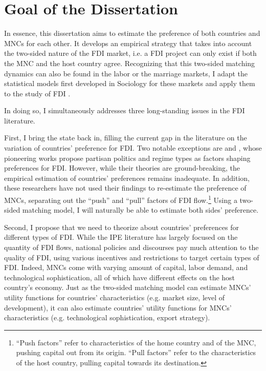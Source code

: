 \section{Goal of the Dissertation}

In essence, this dissertation aims to estimate the preference of both countries
and MNCs for each other. It develops an empirical strategy that takes into
account the two-sided nature of the FDI market, i.e. a FDI project can only
exist if both the MNC and the host country agree. Recognizing that this
two-sided matching dynamics can also be found in the labor or the marriage
markets, I adapt the statistical models first developed in Sociology for these
markets and apply them to the study of FDI \citep{Logan1996, Logan2008}.

In doing so, I simultaneously addresses three long-standing issues in the FDI literature.

First, I bring the state back in, filling the current gap in the literature on
the variation of countries' preference for FDI. Two notable exceptions are
\citet{Pinto2013} and \citet{Pandya2016}, whose pioneering works propose partisan politics
and regime types as factors shaping preferences for FDI. However,
while their theories are ground-breaking, the empirical estimation of countries'
preferences remains inadequate. In addition, these researchers have not
used their findings to re-estimate the preference of MNCs, separating out the
``push'' and ``pull'' factors of FDI flow.\footnote{``Push factors'' refer to
  characteristics of the home country and of the MNC, pushing capital out from its
  origin. ``Pull factors''
  refer to the characteristics of the host country, pulling capital towards its
  destination.} Using a two-sided matching model, I will naturally be able to
estimate both sides' preference.

Second, I propose that we need to theorize about countries' preferences for
different types of FDI. While the IPE literature has largely focused on the
quantity of FDI flows, national policies and discourses pay much attention to the quality of FDI, using various
incentives and restrictions to target certain types of FDI. Indeed, MNCs come
with varying amount of capital, labor demand, and technological sophistication,
all of which have different effects on the host country's economy. Just as the
two-sided matching model can estimate MNCs' utility functions for countries'
characteristics (e.g. market size, level of development), it can also estimate
countries' utility functions for MNCs' characteristics (e.g. technological
sophistication, export strategy).

